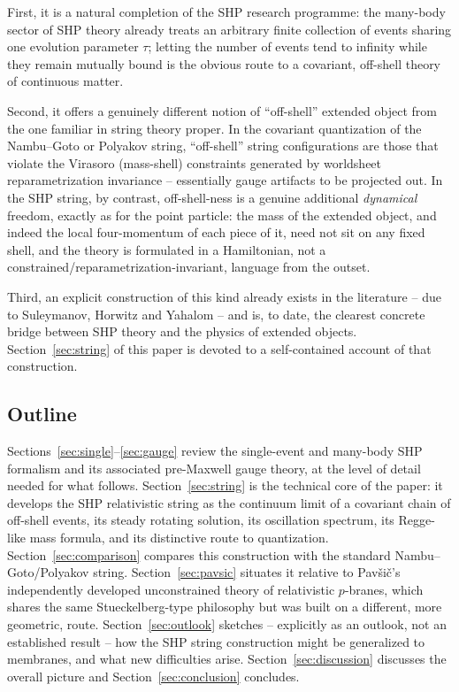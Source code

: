 \documentclass[11pt]{article}
\begin{document}
First, it is a natural completion of the SHP research programme: the many-body
sector of SHP theory already treats an arbitrary finite collection of events
sharing one evolution parameter $\tau$; letting the number of events tend to
infinity while they remain mutually bound is the obvious route to a covariant,
off-shell theory of continuous matter.

Second, it offers a genuinely different notion of ``off-shell'' extended object
from the one familiar in string theory proper. In the covariant quantization of
the Nambu--Goto or Polyakov string, ``off-shell'' string configurations are
those that violate the Virasoro (mass-shell) constraints generated by
worldsheet reparametrization invariance -- essentially gauge artifacts to be
projected out. In the SHP string, by contrast, off-shell-ness is a genuine
additional \emph{dynamical} freedom, exactly as for the point particle: the
mass of the extended object, and indeed the local four-momentum of each piece
of it, need not sit on any fixed shell, and the theory is formulated in a
Hamiltonian, not a constrained/reparametrization-invariant, language from the
outset.

Third, an explicit construction of this kind already exists in the literature
-- due to Suleymanov, Horwitz and Yahalom \cite{SuleymanovHorwitzYahalom2017}
-- and is, to date, the clearest concrete bridge between SHP theory and the
physics of extended objects. Section~\ref{sec:string} of this paper is devoted
to a self-contained account of that construction.

\subsection{Outline}

Sections~\ref{sec:single}--\ref{sec:gauge} review the single-event and
many-body SHP formalism and its associated pre-Maxwell gauge theory, at the
level of detail needed for what follows.
Section~\ref{sec:string} is the technical core of the paper: it develops the
SHP relativistic string as the continuum limit of a covariant chain of
off-shell events, its steady rotating solution, its oscillation spectrum, its
Regge-like mass formula, and its distinctive route to quantization.
Section~\ref{sec:comparison} compares this construction with the standard
Nambu--Goto/Polyakov string. Section~\ref{sec:pavsic} situates it relative to
Pavši\v{c}'s independently developed unconstrained theory of relativistic
$p$-branes, which shares the same Stueckelberg-type philosophy but was built on
a different, more geometric, route. Section~\ref{sec:outlook} sketches --
explicitly as an outlook, not an established result -- how the SHP string
construction might be generalized to membranes, and what new difficulties
arise. Section~\ref{sec:discussion} discusses the overall picture and
Section~\ref{sec:conclusion} concludes.
\end{document}
